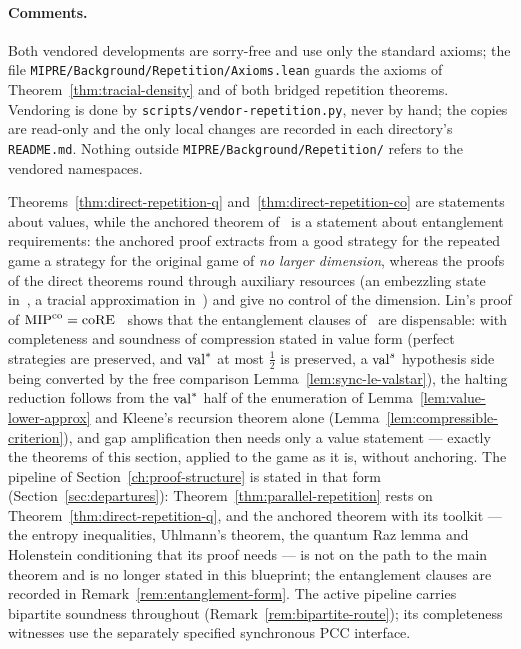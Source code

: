 \paragraph{Comments.} Both vendored developments are sorry-free and use only the
standard axioms; the file \texttt{MIPRE/Background/Repetition/Axioms.lean} guards the
axioms of Theorem~\ref{thm:tracial-density} and of both bridged repetition theorems.
Vendoring
is done by \texttt{scripts/vendor-repetition.py}, never by hand; the copies are
read-only and the only local changes are recorded in each directory's
\texttt{README.md}. Nothing outside \texttt{MIPRE/Background/Repetition/} refers to
the vendored namespaces.

\begin{remark}
\label{rem:direct-vs-anchored}
Theorems~\ref{thm:direct-repetition-q} and~\ref{thm:direct-repetition-co} are
statements about values, while the anchored theorem of~\cite{BVY17} is a statement
about entanglement requirements: the anchored proof extracts from a good strategy for the repeated game a
strategy for the original game of \emph{no larger dimension}, whereas the proofs of the
direct theorems round through auxiliary resources (an embezzling state
in~\cite{OpenAI26}, a tracial approximation in~\cite{Vid26}) and give no control of the
dimension. Lin's proof of $\mathrm{MIP}^{\mathrm{co}} = \mathrm{coRE}$~\cite{Lin25} shows that the entanglement clauses
of~\cite{JNVWY20} are dispensable: with completeness and soundness of compression stated
in value form (perfect strategies are preserved, and $\mathrm{val}^*$ at most $\frac12$ is
preserved, a $\mathrm{val}^{s}$ hypothesis side being converted by the free comparison
Lemma~\ref{lem:sync-le-valstar}), the halting reduction follows from the $\mathrm{val}^*$ half of
the enumeration of Lemma~\ref{lem:value-lower-approx}
and Kleene's recursion theorem alone (Lemma~\ref{lem:compressible-criterion}), and gap
amplification then needs only a value statement --- exactly the theorems of this section,
applied to the game as it is, without anchoring. The pipeline of
Section~\ref{ch:proof-structure} is stated in that form (Section~\ref{sec:departures}):
Theorem~\ref{thm:parallel-repetition} rests on Theorem~\ref{thm:direct-repetition-q},
and the anchored theorem with its toolkit --- the entropy inequalities, Uhlmann's
theorem, the quantum Raz lemma and Holenstein conditioning that its proof needs --- is
not on the path to the main theorem and is no longer stated in this blueprint; the
entanglement clauses are recorded in Remark~\ref{rem:entanglement-form}. The active
pipeline carries bipartite soundness throughout (Remark~\ref{rem:bipartite-route}); its
completeness witnesses use the separately specified synchronous PCC interface.
\end{remark}
